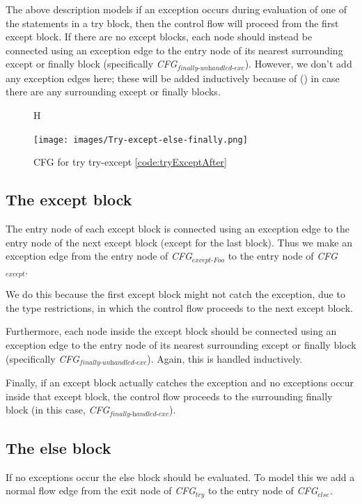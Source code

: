 The above description models if an exception occurs during evaluation of one of the statements in a try block, then the control flow will proceed from the first except block. If there are no except blocks, each node should instead be connected using an exception edge to the entry node of its nearest surrounding except or finally block (specifically \textit{CFG$_{\textit{finally-unhandled-exc}}$}). However, we don't add any exception edges here; these will be added inductively because of (\inlinecode{*}) in case there are any surrounding except or finally blocks.

\begin{figure}{H}
  \begin{center}
    \texttt{[image: images/Try-except-else-finally.png]}
  \end{center}
  \caption{CFG for try try-except \autoref{code:tryExceptAfter}}
  \label{fig:forCfg}
\end{figure}

\subsection{The except block}
The entry node of each except block is connected using an exception edge to the entry node of the next except block (except for the last block). Thus we make an exception edge from the entry node of \textit{CFG$_{\textit{except-Foo}}$} to the entry node of \textit{CFG$_{\textit{except}}$}.

We do this because the first except block might not catch the exception, due to the type restrictions, in which the control flow proceeds to the next except block.

Furthermore, each node inside the except block should be connected using an exception edge to the entry node of its nearest surrounding except or finally block (specifically \textit{CFG$_{\textit{finally-unhandled-exc}}$}). Again, this is handled inductively.

Finally, if an except block actually catches the exception and no exceptions occur inside that except block, the control flow proceeds to the surrounding finally block (in this case, \textit{CFG$_{\textit{finally-handled-exc}}$}). 



\subsection{The else block}
If no exceptions occur the else block should be evaluated. To model this we add a normal flow edge from the exit node of \textit{CFG$_{\textit{try}}$} to the entry node of \textit{CFG$_{\textit{else}}$}.

